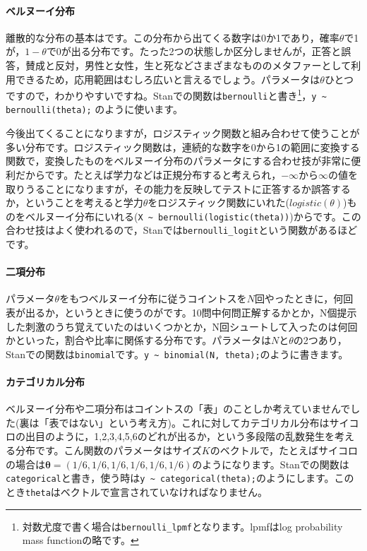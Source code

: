 \documentclass{ltjsbook}
\begin{document}
\paragraph{ベルヌーイ分布}
離散的な分布の基本はです。この分布から出てくる数字は0か1であり，確率$\theta$で1が，$1-\theta$で0が出る分布です。たった2つの状態しか区分しませんが，正答と誤答，賛成と反対，男性と女性，生と死などさまざまなもののメタファーとして利用できるため，応用範囲はむしろ広いと言えるでしょう。パラメータは$\theta$ひとつですので，わかりやすいですね。Stanでの関数は\texttt{bernoulli}と書き\footnote{対数尤度で書く場合は\verb|bernoulli_lpmf|となります。lpmfはlog probability mass functionの略です。}，\verb|y ~ bernoulli(theta);| のように使います。

今後出てくることになりますが，ロジスティック関数と組み合わせて使うことが多い分布です。ロジスティック関数は，連続的な数字を0から1の範囲に変換する関数で，変換したものをベルヌーイ分布のパラメータにする合わせ技が非常に便利だからです。たとえば学力などは正規分布すると考えられ，$-\infty$から$\infty$の値を取りうることになりますが，その能力を反映してテストに正答するか誤答するか，ということを考えると学力$\theta$をロジスティック関数にいれた($logistic(\theta)$)ものをベルヌーイ分布にいれる(\verb|X ~ bernoulli(logistic(theta))|)からです。この合わせ技はよく使われるので，Stanでは\verb|bernoulli_logit|という関数があるほどです。
\paragraph{二項分布}
パラメータ$\theta$をもつベルヌーイ分布に従うコイントスを$N$回やったときに，何回表が出るか，というときに使うのがです。10問中何問正解するかとか，N個提示した刺激のうち覚えていたのはいくつかとか，N回シュートして入ったのは何回かといった，割合や比率に関係する分布です。パラメータは$N$と$\theta$の2つあり，Stanでの関数は\texttt{binomial}です。\verb|y ~ binomial(N, theta);|のように書きます。

\paragraph{カテゴリカル分布}
ベルヌーイ分布や二項分布はコイントスの「表」のことしか考えていませんでした(裏は「表ではない」という考え方)。これに対してカテゴリカル分布はサイコロの出目のように，1,2,3,4,5,6のどれが出るか，という多段階の乱数発生を考える分布です。こん関数のパラメータはサイズ$K$のベクトルで，たとえばサイコロの場合は$\bm{\theta}=(1/6,1/6,1/6,1/6,1/6,1/6)$のようになります。Stanでの関数は\texttt{categorical}と書き，使う時は\verb|y ~ categorical(theta);|のようにします。このとき\verb|theta|はベクトルで宣言されていなければなりません。
\end{document}
